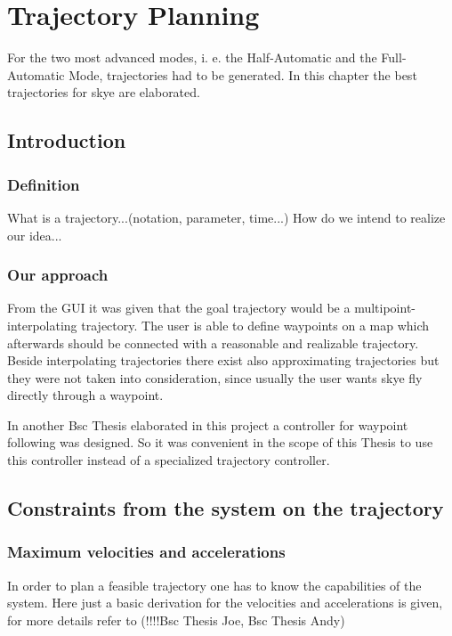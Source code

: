 \chapter{Trajectory Planning}
For the two most advanced modes, i. e. the Half-Automatic and the Full-Automatic Mode, trajectories had to be generated. In this chapter the best trajectories for skye are elaborated.

\section{Introduction}

\subsection{Definition}
What is a trajectory...(notation, parameter, time...)
How do we intend to realize our idea... 

\subsection{Our approach}
From the GUI it was given that the goal trajectory would be a multipoint-interpolating trajectory. The user is able to define waypoints on a map which afterwards should be connected with a reasonable and realizable trajectory. Beside interpolating trajectories there exist also approximating trajectories but they were not taken into consideration, since usually the user wants skye fly directly through a waypoint.

In another Bsc Thesis elaborated in this project a controller for waypoint following was designed. So it was convenient in the scope of this Thesis to use this controller instead of a specialized trajectory controller.

\section{Constraints from the system on the trajectory}

\subsection{Maximum velocities and accelerations}
In order to plan a feasible trajectory one has to know the capabilities of the system. Here just a basic derivation for the velocities and accelerations is given, for more details refer to (!!!!Bsc Thesis Joe, Bsc Thesis Andy)\\


